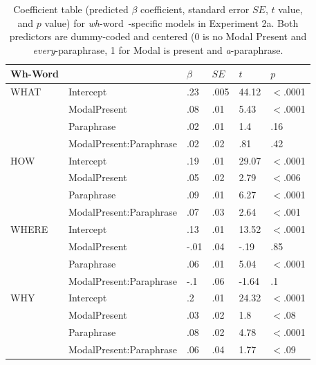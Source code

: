 \documentclass[12pt,letterpaper,table,svgnames,dvipsnames]{article}
\newcommand{\whw}{\emph{wh}-word~}
\begin{document}
\begin{table}
\begin{center} 
\caption{Coefficient table (predicted $\beta$ coefficient, standard error $SE$, $t$ value, and $p$ value) for \whw-specific models in Experiment 2a. Both predictors are dummy-coded and centered (0 is no Modal Present and \emph{every}-paraphrase, 1 for Modal is present and \emph{a}-paraphrase.} 
\label{sub-model_res_ex2a} 
\begin{tabular}{llllll} 
\toprule
Wh-Word & {} & $\beta$ & $SE$ & $t$ & $p$\\
\midrule
WHAT & Intercept & .23 & .005 & 44.12 & $<$.0001\\
{} & ModalPresent & .08 & .01 & 5.43 & $<$.0001\\
{} & Paraphrase & .02 & .01 & 1.4 & .16\\
{} & ModalPresent:Paraphrase & .02 & .02 & .81 & .42\\
\midrule
HOW & Intercept & .19 & .01 & 29.07 & $<$.0001\\
{} & ModalPresent & .05 & .02 & 2.79 & $<$.006\\
{} & Paraphrase & .09 & .01 & 6.27 & $<$.0001\\
{} & ModalPresent:Paraphrase & .07 & .03 & 2.64 & $<$.001\\
\midrule
WHERE & Intercept & .13 & .01 & 13.52 & $<$.0001\\
{} & ModalPresent & -.01 & .04 & -.19 & .85\\
{} & Paraphrase & .06 & .01 & 5.04 & $<$.0001\\
{} & ModalPresent:Paraphrase & -.1 & .06 & -1.64 & .1\\
\midrule
WHY & Intercept & .2 & .01 & 24.32 & $<$.0001\\
{} & ModalPresent & .03 & .02 & 1.8 & $<$.08\\
{} & Paraphrase & .08 & .02 & 4.78 & $<$.0001\\
{} & ModalPresent:Paraphrase & .06 & .04 & 1.77 & $<$.09\\

\end{tabular}
\end{center}
\end{table}
\end{document}
